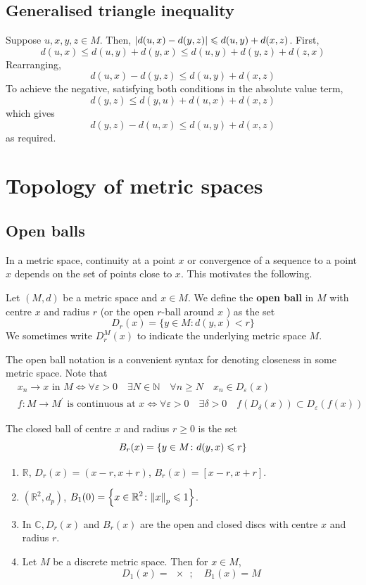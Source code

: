 \documentclass[a4paper,11pt]{article}
\begin{document}
\subsection{Generalised triangle inequality}
Suppose \( u,x,y,z \in M \).
Then, \( \abs{d(u,x) - d(y,z)} \leqslant d(u,y) + d(x,z) \).
First,
\[
	d(u,x) \leq d(u,y) + d(y,x) \leq d(u,y) + d(y,z) + d(z,x)
\]
Rearranging,
\[
	d(u,x)-d(y,z) \leq d(u,y) + d(x,z)
\]
To achieve the negative, satisfying both conditions in the absolute value term,
\[
	d(y,z) \leq d(y,u) + d(u,x) + d(x,z)
\]
which gives
\[
	d(y,z) - d(u,x) \leq d(u,y) + d(x,z)
\]
as required.

\section{Topology of metric spaces}
\subsection{Open balls}
In a metric space, continuity at a point $x$ or convergence of a sequence to a point $x$ depends on the set of points close to $x$. This motivates the following.
\begin{definition}
	Let $(M, d)$ be a metric space and $x \in M$. We define the \textbf{open ball} in $M$ with centre $x$ and radius $r$ (or the open $r$-ball around $x$ ) as the set
    \[
    D_r(x)=\{y \in M: d(y, x)<r\}
    \]
    We sometimes write $D_r^M(x)$ to indicate the underlying metric space $M$.
\end{definition}
The open ball notation is a convenient syntax for denoting closeness in some metric space.
Note that
\[
    \begin{aligned}
        &x_n \rightarrow x \text { in } M \Longleftrightarrow \forall \varepsilon>0\quad \exists N \in \mathbb{N}\quad \forall n \geqslant N \quad x_n \in D_{\varepsilon}(x) \\
        &f: M \rightarrow M^{\prime} \text { is continuous at } x \Longleftrightarrow \forall \varepsilon>0\quad \exists \delta>0\quad f\left(D_\delta(x)\right) \subset D_{\varepsilon}(f(x))
    \end{aligned}
\]
\begin{definition}
	The closed ball of centre \( x \) and radius \( r \geq 0 \) is the set
	\[
		B_r(x) = \qty{y \in M \colon d(y,x) \leqslant r}
	\]
\end{definition}
\begin{example} 
	\begin{enumerate}
        \item \( \mathbb R \), \( D_r(x) = (x-r,x+r) \),
        \( B_r(x) = [x-r,x+r] \).
        \item \( (\mathbb R^2, d_p) \), $\displaystyle B_1(0) = \left\{ x \in \mathbb R^2 \colon \norm{x}_p \leqslant 1  \right\}$. 
        \item In $\mathbb{C}, D_r(x)$ and $B_r(x)$ are the open and closed discs with centre $x$ and radius $r$.
        \item Let \( M \) be a discrete metric space.
        Then for \( x \in M \),
        \[
            D_1(x) = \qty{x};\quad B_1(x) = M
        \]
    \end{enumerate}
\end{example}
\end{document}

